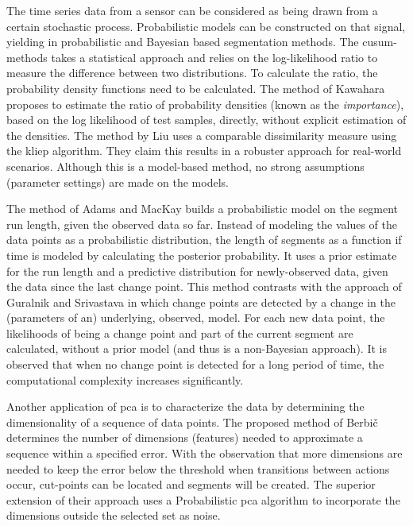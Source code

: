 The time series data from a sensor can be considered as being drawn from a certain stochastic process.
Probabilistic models can be constructed on that signal, yielding in probabilistic and Bayesian based segmentation methods.
The \gls{cusum}-methods takes a statistical approach and relies on the log-likelihood ratio \cite{gustafsson1996marginalized} to measure the difference between two distributions.
To calculate the ratio, the probability density functions need to be calculated.
The method of Kawahara \etal \cite{kawahara2009change} proposes to estimate the ratio of probability densities (known as the \emph{importance}), based on the log likelihood of test samples, directly, without explicit estimation of the densities.
The method by Liu \etal \cite{liu2013change} uses a comparable dissimilarity measure using the \gls{kliep} algorithm.
They claim this results in a robuster approach for real-world scenarios.
Although this is a model-based method, no strong assumptions (parameter settings) are made on the models.

The method of Adams and MacKay \cite{adams2007bayesian} builds a probabilistic model on the segment run length, given the observed data so far.
Instead of modeling the values of the data points as a probabilistic distribution, the length of segments as a function if time is modeled by calculating the posterior probability.
It uses a prior estimate for the run length and a predictive distribution for newly-observed data, given the data since the last change point.
This method contrasts with the approach of Guralnik and Srivastava \cite{guralnik1999event} in which change points are detected by a change in the (parameters of an) underlying, observed, model.
For each new data point, the likelihoods of being a change point and part of the current segment are calculated, without a prior model (and thus is a non-Bayesian approach).
It is observed that when no change point is detected for a long period of time, the computational complexity increases significantly.

Another application of \gls{pca} is to characterize the data by determining the dimensionality of a sequence of data points.
The proposed method of Berbi\v{c} \etal \cite{barbivc2004segmenting} determines the number of dimensions (features) needed to approximate a sequence within a specified error.
With the observation that more dimensions are needed to keep the error below the threshold when transitions between actions occur, cut-points can be located and segments will be created.
The superior extension of their approach uses a Probabilistic \gls{pca} algorithm to incorporate the dimensions outside the selected set as noise.

